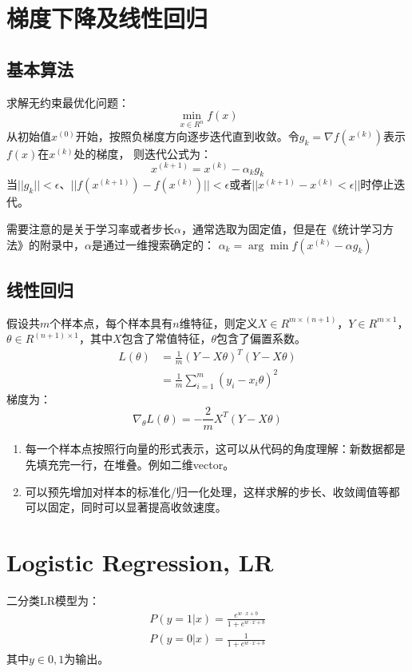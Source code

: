 \section{梯度下降及线性回归}
\subsection{基本算法}
求解无约束最优化问题：
\begin{equation*}
    \min_{x \in R^n} f(x)
\end{equation*}
从初始值$x^{(0)}$开始，按照负梯度方向逐步迭代直到收敛。令$g_k = \nabla f(x^{(k)})$表示$f(x)$在$x^{(k)}$处的梯度，
则迭代公式为：
\begin{equation*}
    x^{(k+1)} = x^{(k)} - \alpha_k g_k
\end{equation*}
当$||g_k|| < \epsilon$、$||f(x^{(k+1)}) - f(x^{(k)})|| < \epsilon$或者$||x^{(k+1)} - x^{(k)} < \epsilon||$时停止迭代。

需要注意的是关于学习率或者步长$\alpha$，通常选取为固定值，但是在《统计学习方法》的附录中，$\alpha$是通过一维搜索确定的：
$\alpha_k = \arg \min f(x^{(k)} - \alpha g_k)$

\subsection{线性回归}
假设共$m$个样本点，每个样本具有$n$维特征，则定义$X \in R^{m \times (n+1)}$，$Y \in R^{m\times 1}$，
$\theta \in R^{(n+1)\times 1}$，其中$X$包含了常值特征，$\theta$包含了偏置系数。
\begin{align*}
    L(\theta) &= \frac{1}{m} (Y-X\theta)^T (Y-X\theta) \\
    &= \frac{1}{m} \sum_{i=1}^m (y_i - x_i \theta)^2
\end{align*}
梯度为：
\begin{equation*}
    \nabla_\theta L(\theta) = -\frac{2}{m} X^T (Y-X\theta)
\end{equation*}

{}
\begin{enumerate}
\item 每一个样本点按照行向量的形式表示，这可以从代码的角度理解：新数据都是先填充完一行，在堆叠。例如二维vector。
\item 可以预先增加对样本的标准化/归一化处理，这样求解的步长、收敛阈值等都可以固定，同时可以显著提高收敛速度。
\end{enumerate}


\section{Logistic Regression, LR}
二分类LR模型为：
\begin{gather*}
    P(y=1|x) = \frac{e^{w\cdot x + b}}{1 + e^{w\cdot x + b}}\\
    P(y=0|x) = \frac{1}{1 + e^{w\cdot x + b}}
\end{gather*}
其中$y\in{0,1}$为输出。

